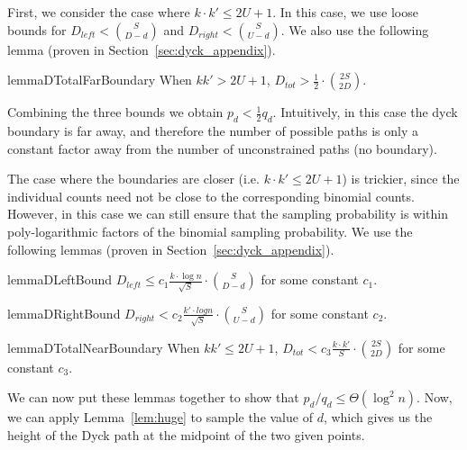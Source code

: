 First, we consider the case where $k\cdot k'\le 2U+1$.
In this case, we use loose bounds for $D_{left} < \binom{S}{D-d}$ and $D_{right} < \binom{S}{U-d}$.
We also use the following lemma (proven in Section~\ref{sec:dyck_appendix}).

\begin{restatable}{lemma}{DTotalFarBoundary}
\label{lem:DTotalFarBoundary}
When $kk' > 2U + 1$, $D_{tot} > \frac 12\cdot \binom{2S}{2D}$.
\end{restatable}

Combining the three bounds we obtain $p_d < \frac 12 q_d$.
Intuitively, in this case the dyck boundary is far away, and therefore the number of possible paths
is only a constant factor away from the number of unconstrained paths (no boundary).

The case where the boundaries are closer (i.e. $k\cdot k' \le 2U+1$) is trickier,
since the individual counts need not be close to the corresponding binomial counts.
However, in this case we can still ensure that the sampling probability is within
poly-logarithmic factors of the binomial sampling probability.
We use the following lemmas (proven in Section~\ref{sec:dyck_appendix}).

\begin{restatable}{lemma}{DLeftBound}
\label{lem:DLeftBound}
$D_{left} \le c_1 \frac{ k\cdot\log n}{\sqrt{S}}\cdot{{S}\choose{D-d}}$ for some constant $c_1$.
\end{restatable}

\begin{restatable}{lemma}{DRightBound}
\label{lem:DRightBound}
$D_{right} < c_2 \frac{k'\cdot log n}{\sqrt{S}}\cdot{{S}\choose{U-d}}$ for some constant $c_2$.
\end{restatable}

\begin{restatable}{lemma}{DTotalNearBoundary}
\label{lem:DTotalNearBoundary}
When $kk' \le 2U + 1$, $D_{tot} < c_3 \frac{k\cdot k'}{S}\cdot{{2S}\choose{2D}}$ for some constant $c_3$.
\end{restatable}

We can now put these lemmas together to show that $p_d/q_d \le \Theta(\log^2 n)$.
Now, we can apply Lemma~\ref{lem:huge} to sample the value of $d$,
which gives us the height of the Dyck path at the midpoint of the two given points.

